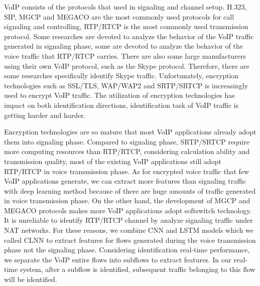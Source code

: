 \documentclass[conference]{IEEEtran}
\begin{document}

VoIP consists of the protocols that used in signaling and channel setup. H.323, SIP, MGCP and MEGACO are the most commonly used protocols for call signaling and controlling, RTP/RTCP is the most commonly used transmission protocol. Some researches \cite{14,16,13} are devoted to analyze the behavior of the VoIP traffic generated in signaling phase, some \cite{4,15} are devoted to analyze the behavior of the voice traffic that RTP/RTCP carries. There are also some large manufacturers using their own VoIP protocol, such as the Skype protocol. Therefore, there are some researches \cite{skype1,skype2,skype3} specifically identify Skype traffic. Unfortunately, encryption technologies such as SSL/TLS, WAP/WAP2 and SRTP/SRTCP is increasingly used to encrypt VoIP traffic. The utilization of encryption technologies has impact on both identification directions, identification task of VoIP traffic is getting harder and harder.

Encryption technologies are so mature that most VoIP applications already adopt them into signaling phase. Compared to signaling phase, SRTP/SRTCP require more computing resources than RTP/RTCP, considering calculation ability and transmission quality, most of the existing VoIP applications still adopt RTP/RTCP in voice transmission phase. As for encrypted voice traffic that few VoIP applications generate, we can extract more features than signaling traffic with deep learning method because of there are huge amounts of traffic generated in voice transmission phase. On the other hand, the development of MGCP and MEGACO protocols makes more VoIP applications adopt softswitch technology. It is unreliable to identify RTP/RTCP channel by analyze signaling traffic under NAT networks. For these reasons, we combine CNN and LSTM models which we called CLNN to extract features for flows generated during the voice transmission phase not the signaling phase.
Considering identification real-time performance, we separate the VoIP entire flows into subflows to extract features. In our real-time system, after a subflow is identified, subsequent traffic belonging to this flow will be identified.
\end{document}
